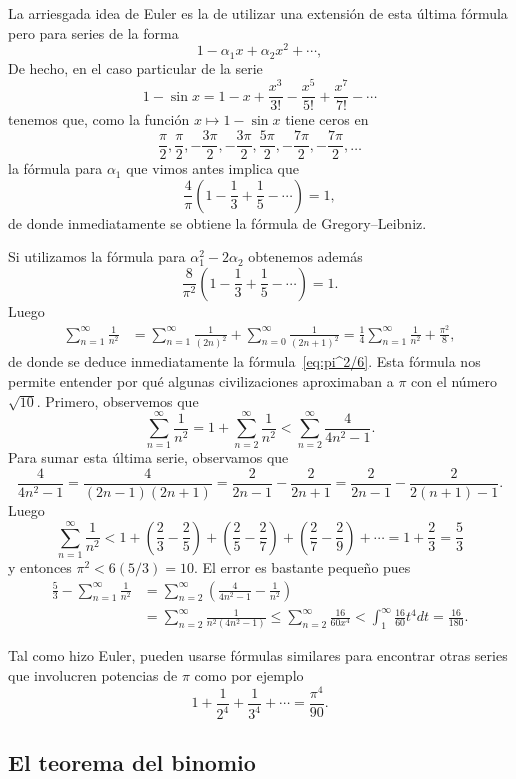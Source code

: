 La arriesgada idea de Euler es la de utilizar una extensión de esta última
fórmula pero para series de la forma
\[
	1-\alpha_1x+\alpha_2x^2+\cdots,
\]
De hecho, en el caso particular de la serie
\[
	1-\sin x=1-x+\frac{x^3}{3!}-\frac{x^5}{5!}+\frac{x^7}{7!}-\cdots
\]
tenemos que, como la función $x\mapsto 1-\sin x$ tiene ceros en 
\[
	\frac{\pi}{2},\frac{\pi}{2},-\frac{3\pi}{2},-\frac{3\pi}{2},\frac{5\pi}{2},-\frac{7\pi}{2},-\frac{7\pi}{2},\dots
\]
la fórmula para $\alpha_1$ que vimos antes implica que
\[
	\frac{4}{\pi}\left(1-\frac13+\frac15-\cdots\right)=1,
\]
de donde inmediatamente se obtiene la fórmula de Gregory--Leibniz.  

Si utilizamos la
fórmula para $\alpha_1^2-2\alpha_2$ obtenemos además 
\[
	\frac{8}{\pi^2}\left(1-\frac13+\frac15-\cdots\right)=1.
\]
Luego
\begin{align*}
	\sum_{n=1}^\infty\frac{1}{n^2} &= \sum_{n=1}^\infty\frac{1}{(2n)^2}+\sum_{n=0}^\infty\frac{1}{(2n+1)^2}=\frac14\sum_{n=1}^\infty\frac{1}{n^2}+\frac{\pi^2}{8},
\end{align*}
de donde se deduce inmediatamente la fórmula~\eqref{eq:pi^2/6}.
Esta fórmula nos permite entender por qué algunas civilizaciones aproximaban a
$\pi$ con el número $\sqrt{10}$. Primero, observemos que 
\[
	\sum_{n=1}^\infty\frac{1}{n^2}=1+\sum_{n=2}^\infty\frac{1}{n^2}<\sum_{n=2}^\infty\frac{4}{4n^2-1}.
\]
Para sumar esta última serie, observamos que
\[
	\frac{4}{4n^2-1}=\frac{4}{(2n-1)(2n+1)}=\frac{2}{2n-1}-\frac{2}{2n+1}=\frac{2}{2n-1}-\frac{2}{2(n+1)-1}.
\]
Luego 
\[
	\sum_{n=1}^\infty\frac{1}{n^2}<1+\left(\frac23-\frac25\right)+\left(\frac25-\frac27\right)+\left(\frac27-\frac29\right)+\cdots=1+\frac23=\frac53
\]
y entonces $\pi^2<6(5/3)=10$. El error es bastante pequeño pues 
\begin{align*}
	\frac53-\sum_{n=1}^\infty\frac{1}{n^2}
	&=\sum_{n=2}^\infty\left(\frac{4}{4n^2-1}-\frac{1}{n^2}\right)\\
	&=\sum_{n=2}^\infty\frac{1}{n^2(4n^2-1)}
	\leq\sum_{n=2}^\infty\frac{16}{60x^4}
	<\int_1^{\infty}\frac{16}{60}t^4dt=\frac{16}{180}.
\end{align*}

Tal como hizo Euler, pueden usarse fórmulas similares para encontrar otras series 
que involucren potencias de $\pi$ como por ejemplo
\[
	1+\frac{1}{2^4}+\frac{1}{3^4}+\cdots=\frac{\pi^4}{90}.
\]


\subsection*{El teorema del binomio}

